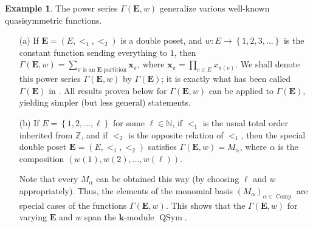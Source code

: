 \documentclass[12pt]{article}
\theoremstyle{plain}
\theoremstyle{definition}
\newtheorem{example}[theorem]{Example}
\theoremstyle{remark}
\let\sumnonlimits\sum
\let\prodnonlimits\prod
\renewcommand{\sum}{\sumnonlimits\limits}
\renewcommand{\prod}{\prodnonlimits\limits}
\newcommand{\kk}{{\mathbf{k}}}
\newcommand{\xx}{{\mathbf{x}}}
\newcommand{\Comp}{{\operatorname{Comp}}}
\newcommand{\QSym}{{\operatorname{QSym}}}
\newcommand{\EE}{{\mathbf{E}}}
\newcommand{\NN}{{\mathbb{N}}}
\newcommand{\ZZ}{{\mathbb{Z}}}
\begin{document}
\begin{example}
\label{exam.Gamma}
The power series $\Gamma\left(\EE , w\right)$ generalize various
well-known quasisymmetric functions.

\begin{enumerate}
\item[(a)] If $\EE = \left(E, <_1, <_2\right)$ is a double poset, and
$w : E \to \left\{1, 2, 3, \ldots\right\}$ is the constant
function sending everything to $1$, then
$\Gamma\left(\EE , w\right)
= \sum_{\pi\text{ is an }\EE\text{-partition}} \xx_{\pi}$,
where $\xx_{\pi} = \prod_{e \in E} x_{\pi\left(e\right)}$.
We shall denote this power series $\Gamma\left(\EE , w\right)$
by $\Gamma\left(\EE\right)$; it is exactly what has been called
$\Gamma\left(\EE\right)$ in \cite[\S 2.2]{Mal-Reu-DP}. All results
proven below for $\Gamma\left(\EE , w\right)$ can be applied to
$\Gamma\left(\EE\right)$, yielding simpler (but less general)
statements.

\item[(b)] If $E = \left\{1, 2, \ldots, \ell\right\}$ for some
$\ell \in \NN$, if $<_1$ is the usual total order inherited from
$\ZZ$, and if $<_2$ is the opposite relation of $<_1$, then the
special double poset $\EE = \left(E, <_1, <_2\right)$ satisfies
$\Gamma\left(\EE, w\right) = M_\alpha$, where $\alpha$ is the
composition $\left(w\left(1\right), w\left(2\right), \ldots,
w\left(\ell\right)\right)$.

Note that every $M_\alpha$ can be obtained
this way (by choosing $\ell$ and $w$ appropriately).
Thus, the elements of the monomial
basis $\left(M_\alpha\right)_{\alpha \in \Comp}$ are special
cases of the functions $\Gamma\left(\EE, w\right)$.
This shows that
the $\Gamma\left(\EE, w\right)$ for varying $\EE$ and $w$
span the $\kk$-module $\QSym$.


\end{enumerate}
\end{example}
\end{document}
